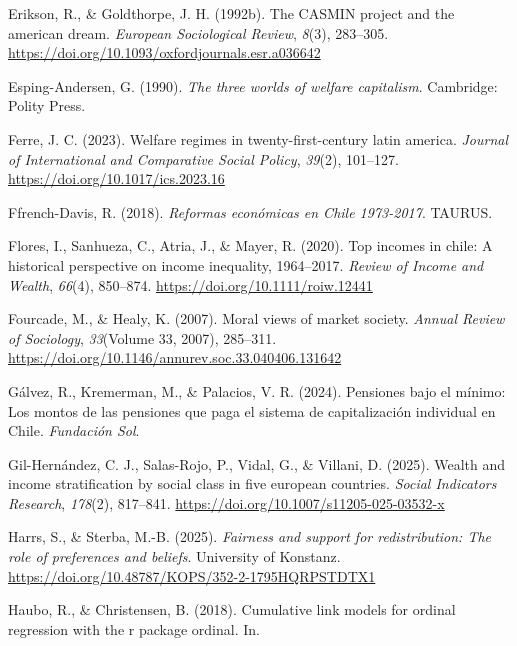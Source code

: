 \documentclass[
  12pt,
]{article}
\newlength{\cslhangindent}
\newenvironment{CSLReferences}[2] %
 {\begin{list}{}{%
  \setlength{\itemindent}{0pt}
  \setlength{\leftmargin}{0pt}
  \setlength{\parsep}{0pt}
  \ifodd #1
   \setlength{\leftmargin}{\cslhangindent}
   \setlength{\itemindent}{-1\cslhangindent}
  \fi
  \setlength{\itemsep}{#2\baselineskip}}}
 {\end{list}}
\begin{document}
\begin{CSLReferences}{1}{0}
Erikson, R., \& Goldthorpe, J. H. (1992b). The CASMIN project and the
american dream. \emph{European Sociological Review}, \emph{8}(3),
283--305. \url{https://doi.org/10.1093/oxfordjournals.esr.a036642}

Esping-Andersen, G. (1990). \emph{The three worlds of welfare
capitalism}. Cambridge: Polity Press.

Ferre, J. C. (2023). Welfare regimes in twenty-first-century latin
america. \emph{Journal of International and Comparative Social Policy},
\emph{39}(2), 101--127. \url{https://doi.org/10.1017/ics.2023.16}

Ffrench-Davis, R. (2018). \emph{Reformas económicas en Chile 1973-2017}.
TAURUS.

Flores, I., Sanhueza, C., Atria, J., \& Mayer, R. (2020). Top incomes in
chile: A historical perspective on income inequality, 1964--2017.
\emph{Review of Income and Wealth}, \emph{66}(4), 850--874.
\url{https://doi.org/10.1111/roiw.12441}

Fourcade, M., \& Healy, K. (2007). Moral views of market society.
\emph{Annual Review of Sociology}, \emph{33}(Volume 33, 2007), 285--311.
\url{https://doi.org/10.1146/annurev.soc.33.040406.131642}

Gálvez, R., Kremerman, M., \& Palacios, V. R. (2024). Pensiones bajo el
mínimo: Los montos de las pensiones que paga el sistema de
capitalización individual en Chile. \emph{Fundación Sol}.

Gil-Hernández, C. J., Salas-Rojo, P., Vidal, G., \& Villani, D. (2025).
Wealth and income stratification by social class in five european
countries. \emph{Social Indicators Research}, \emph{178}(2), 817--841.
\url{https://doi.org/10.1007/s11205-025-03532-x}

Harrs, S., \& Sterba, M.-B. (2025). \emph{Fairness and support for
redistribution: The role of preferences and beliefs}. University of
Konstanz. \url{https://doi.org/10.48787/KOPS/352-2-1795HQRPSTDTX1}

Haubo, R., \& Christensen, B. (2018). Cumulative link models for ordinal
regression with the r package ordinal. In.


\end{CSLReferences}
\end{document}
